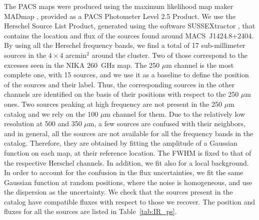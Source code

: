 \documentclass[twocolumn,traditabstract]{aa}
\begin{document}
The PACS maps were produced using the maximum likelihood map maker MADmap \citep{cantalupo2010}, provided as a PACS Photometer Level 2.5 Product. We use the Herschel Source List Product, generated using the software SUSSEXtractor \citep{savage2007}, that contains the location and flux of the sources found around \mbox{MACS~J1424.8+2404}. By using all the Herschel frequency bands, we find a total of 17 sub-millimeter sources in the $4 \times 4$ arcmin$^2$ around the cluster. Two of those correspond to the excesses seen in the NIKA 260~GHz map. The 250 $\mu$m channel is the most complete one, with 15 sources, and we use it as a baseline to define the position of the sources and their label. Thus, the corresponding sources in the other channels are identified on the basis of their positions with respect to the 250 $\mu$m ones. Two sources peaking at high frequency are not present in the 250 $\mu$m catalog and we rely on the 100 $\mu$m channel for them. Due to the relatively low resolution at 500 and 350 $\mu$m, a few sources are confused with their neighbors, and in general, all the sources are not available for all the frequency bands in the catalog. Therefore, they are obtained by fitting the amplitude of a Gaussian function on each map, at their reference location. The FWHM is fixed to that of the respective Herschel channels. In addition, we fit also for a local background. In order to account for the confusion in the flux uncertainties, we fit the same Gaussian function at random positions, where the noise is homogeneous, and use the dispersion as the uncertainty. We check that the sources present in the catalog have compatible fluxes with respect to those we recover. The position and fluxes for all the sources are listed in Table~\ref{tab:IR_ps}.
\end{document}
